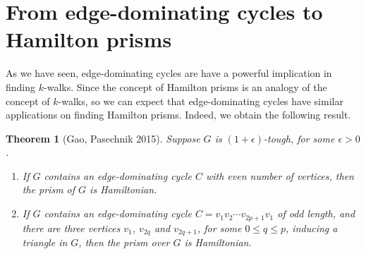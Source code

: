 \documentclass[12pt]{report}
\newtheorem{theorem}{Theorem}
\begin{document}
\section{From edge-dominating cycles to Hamilton prisms}
As we have seen, edge-dominating cycles are have a powerful implication in finding $k$-walks. Since the concept of Hamilton prisms is an analogy of the concept of $k$-walks, so we can expect that edge-dominating cycles have similar applications on finding Hamilton prisms. Indeed, we obtain the following result.
\begin{theorem}[Gao, Pasechnik 2015]\label{edhctohprthlm}
Suppose $G$ is $(1+\epsilon)$-tough, for some $\epsilon>0$.
\begin{enumerate}
\item If $G$ contains an edge-dominating cycle $C$ with even number of vertices, then the prism of $G$ is Hamiltonian.
\item If $G$ contains an edge-dominating cycle $C=v_1v_2\cdots v_{2p+1}v_1$ of odd length, and there are three vertices $v_1$, $v_{2q}$ and $v_{2q+1}$, for some $0\le q\le p$, inducing a triangle in $G$, then the prism over $G$ is Hamiltonian.
\end{enumerate}
\end{theorem}
\end{document}
